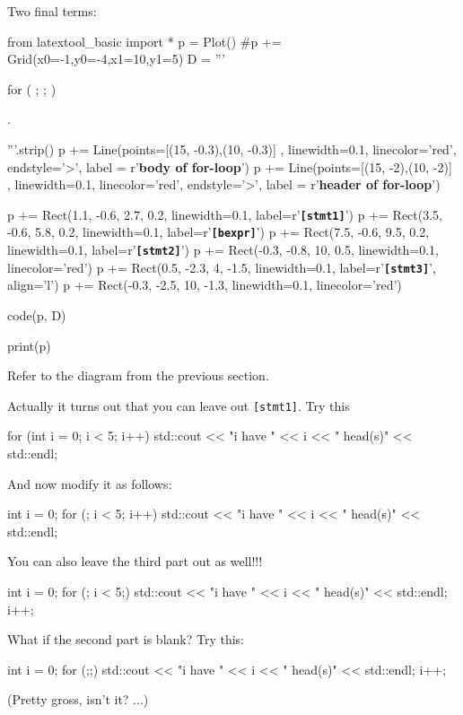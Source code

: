 Two final terms:
\begin{python}
from latextool_basic import *
p = Plot()
#p += Grid(x0=-1,y0=-4,x1=10,y1=5)
D = '''





for (         ;              ;                )




               .






'''.strip()
p += Line(points=[(15, -0.3),(10, -0.3)] , linewidth=0.1, linecolor='red', endstyle='>', label = r'\textbf{body of for-loop}')
p += Line(points=[(15, -2),(10, -2)] , linewidth=0.1, linecolor='red', endstyle='>', label = r'\textbf{header of for-loop}')

p += Rect(1.1, -0.6, 2.7, 0.2, linewidth=0.1, label=r'\texttt{\textbf{[stmt1]}}')
p += Rect(3.5, -0.6, 5.8, 0.2, linewidth=0.1, label=r'\texttt{\textbf{[bexpr]}}')
p += Rect(7.5, -0.6, 9.5, 0.2, linewidth=0.1, label=r'\texttt{\textbf{[stmt2]}}')
p += Rect(-0.3, -0.8, 10, 0.5, linewidth=0.1, linecolor='red')
p += Rect(0.5, -2.3, 4, -1.5, linewidth=0.1, label=r'\texttt{\textbf{[stmt3]}}', align='l')
p += Rect(-0.3, -2.5, 10, -1.3, linewidth=0.1, linecolor='red')

code(p, D)

print(p)
\end{python}

\newpage{}

Refer to the diagram from the previous section.

Actually it turns out that you can leave out \texttt{[stmt1]}. Try this
\begin{console}
for (int i = 0; i < 5; i++)
{   
    std::cout << "i have " << i
              << " head(s)"
              << std::endl;
}
\end{console}
And now modify it as follows:
\begin{console}
int i = 0;
for (; i < 5; i++)
{   
    std::cout << "i have " << i
              << " head(s)"
              << std::endl;
}
\end{console}
You can also leave the third part out as well!!!
\begin{console}
int i = 0;
for (; i < 5;)
{   
    std::cout << "i have " << i
              << " head(s)"
              << std::endl;
    i++;
}
\end{console}
What if the second part is blank? Try this:
\begin{console}
int i = 0;
for (;;)
{   
    std::cout << "i have " << i
              << " head(s)"
              << std::endl;
    i++;
}
\end{console}
(Pretty gross, isn't it? ...)

